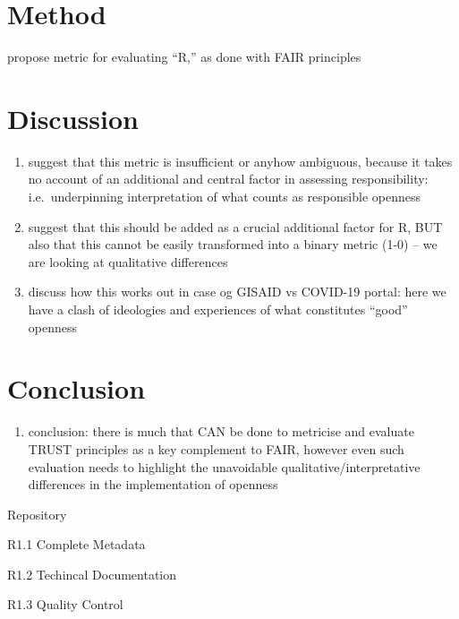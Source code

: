 \documentclass{article}
\providecommand{\tightlist}{%
  \setlength{\itemsep}{0pt}\setlength{\parskip}{0pt}}
\begin{document}
\hypertarget{method}{%
\section{Method}\label{method}}

propose metric for evaluating ``R,'' as done with FAIR principles

\hypertarget{discussion}{%
\section{Discussion}\label{discussion}}

\begin{enumerate}
\def\labelenumi{(\arabic{enumi})}
\setcounter{enumi}{2}
\item
  suggest that this metric is insufficient or anyhow ambiguous, because
  it takes no account of an additional and central factor in assessing
  responsibility: i.e.~underpinning interpretation of what counts as
  responsible openness
\item
  suggest that this should be added as a crucial additional factor for
  R, BUT also that this cannot be easily transformed into a binary
  metric (1-0) -- we are looking at qualitative differences
\item
  discuss how this works out in case og GISAID vs COVID-19 portal: here
  we have a clash of ideologies and experiences of what constitutes
  ``good'' openness
\end{enumerate}

\hypertarget{conclusion}{%
\section{Conclusion}\label{conclusion}}

\begin{enumerate}
\def\labelenumi{(\arabic{enumi})}
\setcounter{enumi}{5}
\tightlist
\item
  conclusion: there is much that CAN be done to metricise and evaluate
  TRUST principles as a key complement to FAIR, however even such
  evaluation needs to highlight the unavoidable
  qualitative/interpretative differences in the implementation of
  openness
\end{enumerate}

Repository

R1.1 Complete Metadata

R1.2 Techincal Documentation

R1.3 Quality Control
\end{document}
